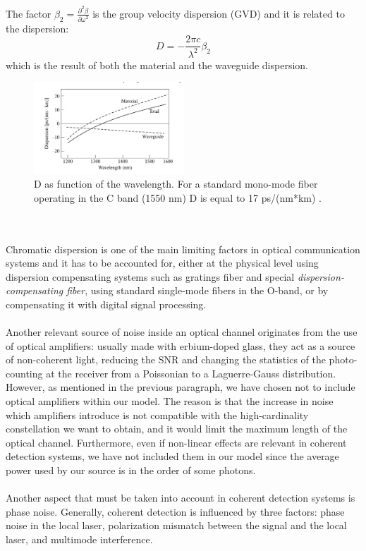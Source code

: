 \documentclass[journal, letterpaper]{IEEEtran}
\begin{document}
The factor $\beta_2 =\frac{ \partial^2\beta}{\partial\omega^2}$ is the group velocity dispersion (GVD) and it is related to the dispersion: 
\[D = -\frac{2\pi c}{\lambda^2}\beta_2\]
which is the result of both the material and the waveguide dispersion. 
\begin{figure}[!h]
    \centering
    \includegraphics[width=0.5\textwidth]{Images/dispersion_scheme.png}
        \caption{D as function of the wavelength. For a standard mono-mode fiber operating in the C band (1550 nm) D is equal to 17 ps/(nm*km)  \cite{keiser,essiambre}.}
     \label{fig:quadtree}
\end{figure}
\\
\\
Chromatic dispersion is one of the main limiting factors in optical communication systems and it has to be accounted for, either at the physical level using dispersion compensating systems such as gratings fiber and special \textit{dispersion-compensating fiber}, using standard single-mode fibers in the O-band, or by compensating it with digital signal processing.
\\
\\
Another relevant source of noise inside an optical channel originates from the use of optical amplifiers: usually made with erbium-doped glass, they act as a source of non-coherent light, reducing the SNR and changing the statistics of the photo-counting at the receiver from a Poissonian to a Laguerre-Gauss distribution\cite{LagMartinelli}. However, as mentioned in the previous paragraph, we have chosen not to include optical amplifiers within our model. The reason is that the increase in noise which amplifiers introduce is not compatible with the high-cardinality constellation we want to obtain, and it would limit the maximum length of the optical channel. Furthermore, even if non-linear effects are relevant in coherent detection systems\cite{essiambre}, we have not included them in our model since the average power used by our source is in the order of some photons. 
\\
\\
Another aspect that must be taken into account in coherent detection systems is phase noise. Generally, coherent detection is influenced by three factors: phase noise in the local laser, polarization mismatch between the signal and the local laser, and multimode interference.
\end{document}
